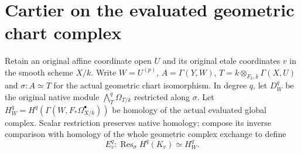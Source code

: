\section{Cartier on the evaluated geometric chart complex}

\begin{definition}
\label{def:cartier-geometric-local-native-domain}
\leanok
{}
Retain an original affine coordinate open $U$ and its original etale
coordinates $v$ in the smooth scheme $X/k$. Write $W=U^{(p)}$, $A=\Gamma(Y,W)$,
$T=k\otimes_{F_k,k}\Gamma(X,U)$ and $\sigma:A\simeq T$ for the actual
geometric chart isomorphism. In degree $q$, let $D_W^q$ be the original
native module $\bigwedge_T^q\Omega_{T/k}$ restricted along $\sigma$.
Let $H_W^q=H^q(\Gamma(W,F_*\Omega^\bullet_{X/k}))$ be homology of the
actual evaluated global complex. Scalar restriction preserves native
homology; compose its inverse comparison with homology of the whole
geometric complex exchange to define
\[
 E_v^q:\operatorname{Res}_{\sigma}H^q(K_v)\simeq H_W^q.
\]
\end{definition}

